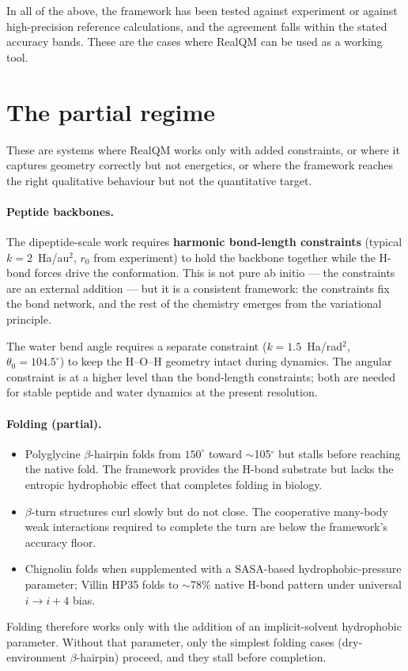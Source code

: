 In all of the above, the framework has been tested against experiment or against high-precision reference calculations, and the agreement falls within the stated accuracy bands. These are the cases where RealQM can be used as a working tool.

\section{The partial regime}\label{sec:partial-regime}

These are systems where RealQM works only with added constraints, or where it captures geometry correctly but not energetics, or where the framework reaches the right qualitative behaviour but not the quantitative target.

\paragraph{Peptide backbones.}
The dipeptide-scale work requires \textbf{harmonic bond-length constraints} (typical $k = 2$~Ha/au$^2$, $r_0$ from experiment) to hold the backbone together while the H-bond forces drive the conformation. This is not pure ab initio --- the constraints are an external addition --- but it is a consistent framework: the constraints fix the bond network, and the rest of the chemistry emerges from the variational principle.

The water bend angle requires a separate constraint ($k = 1.5$~Ha/rad$^2$, $\theta_0 = 104.5^\circ$) to keep the H--O--H geometry intact during dynamics. The angular constraint is at a higher level than the bond-length constraints; both are needed for stable peptide and water dynamics at the present resolution.

\paragraph{Folding (partial).}
\begin{itemize}
\item Polyglycine $\beta$-hairpin folds from $150^\circ$ toward $\sim$105$^\circ$ but stalls before reaching the native fold. The framework provides the H-bond substrate but lacks the entropic hydrophobic effect that completes folding in biology.
\item $\beta$-turn structures curl slowly but do not close. The cooperative many-body weak interactions required to complete the turn are below the framework's accuracy floor.
\item Chignolin folds when supplemented with a SASA-based hydrophobic-pressure parameter; Villin HP35 folds to $\sim$78\% native H-bond pattern under universal $i \to i{+}4$ bias.
\end{itemize}
Folding therefore works only with the addition of an implicit-solvent hydrophobic parameter. Without that parameter, only the simplest folding cases (dry-environment $\beta$-hairpin) proceed, and they stall before completion.

